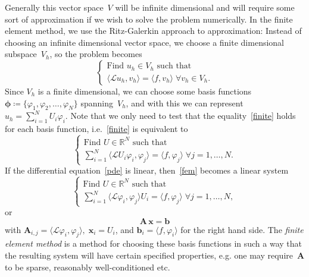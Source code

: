 \documentclass[12pt]{article}
\newcommand{\vect}[1]{\boldsymbol{\mathbf{#1}}}
\newcommand{\dimSize}{N}
\begin{document}
Generally this vector space~$V$ will be infinite dimensional and will require some sort of approximation if we wish to solve the problem numerically. In the finite element method, we use the Ritz-Galerkin approach to approximation: Instead of choosing an infinite dimensional vector 
space, we choose a finite dimensional subspace~$V_{h}$, so the problem becomes
\begin{equation}\label{finite}
\begin{cases} 
	\text{Find } u_{h} \in V_{h} \text{ such that } \\
	\langle \mathcal{L}u_{h}, v_{h} \rangle = \langle f, v_{h} \rangle \; \forall v_{h} \in V_{h}.
\end{cases}
\end{equation}
Since $V_{h}$ is a finite dimensional, we can choose some basis functions~$\vect\phi \coloneqq \{\varphi_1, \varphi_2, \dots, \varphi_\dimSize\}$ spanning~$V_h$, and with this we can represent $u_{h} = \sum_{i = 1}^{\dimSize} U_{i}\varphi_{i}$. Note that we only need to test that the equality~\eqref{finite} holds for each basis function, i.e.~\eqref{finite} is equivalent to
\begin{equation}\label{fem}
\begin{cases} 
	\text{Find } U \in \mathbb{R}^{\dimSize} \text{ such that } \\
	\sum_{i = 1}^{\dimSize}\langle \mathcal{L}U_{i}\varphi_{i}, \varphi_{j} \rangle = \langle f, \varphi_{j} \rangle \; \forall j = 1, \ldots,\dimSize.
\end{cases}
\end{equation}
If the differential equation~\eqref{pde} is linear, then~\eqref{fem} becomes a linear system
\[
\begin{cases} 
	\text{Find } U \in \mathbb{R}^{N} \text{ such that } \\
	\sum_{i = 1}^{N}\langle \mathcal{L}\varphi_{i}, \varphi_{j} \rangle U_{i} = \langle f, \varphi_{j} \rangle \; \forall j = 1, \ldots,\dimSize,
\end{cases}
\]
or
\begin{equation}\label{system}
	\vect A\,\vect x = \vect b
\end{equation}
with $\mathbf{A}_{i,j} = \langle \mathcal{L}\varphi_{i}, \varphi_{j} \rangle,\; \vect x_{i} = U_{i}$, and $\mathbf{b}_{i} = \langle f, \varphi_{i} \rangle$ for the right hand side. The \textit{finite element method} is a method for choosing these basis functions in such a way that the resulting system will have certain specified properties, e.g. one may require~$\mathbf{A}$ to be sparse, reasonably well-conditioned etc.
\end{document}
